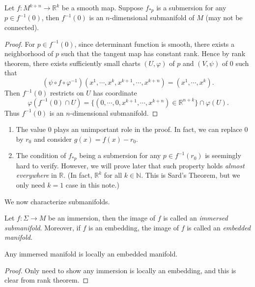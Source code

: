 \begin{thm}
    Let $f:M^{k+n}\to\mathbb{R}^k$ be a smooth map.
    Suppose $f_{*p}$ is a submersion for any $p\in f^{-1}(0)$, then $f^{-1}(0)$ is an $n$-dimensional submanifold of $M$ (may not be connected).
\end{thm}
\begin{proof}
    For $p\in f^{-1}(0)$, since determinant function is smooth, there exists a neighborhood of $p$ such that the tangent map has constant rank.
    Hence by rank theorem, there exists sufficiently small charts $(U,\varphi)$ of $p$ and $(V,\psi)$ of $0$ such that
    \[(\psi\circ f\circ\varphi^{-1})(x^1,\cdots,x^k,x^{k+1},\cdots,x^{k+n})=(x^1,\cdots,x^k).\]
    Then $f^{-1}(0)$ restricts on $U$ has coordinate
    \[\varphi(f^{-1}(0)\cap U)=\{(0,\cdots,0,x^{k+1},\cdots,x^{k+n})\in\mathbb{R}^{n+k}\}\cap\varphi(U).\]
    Thus $f^{-1}(0)$ is an $n$-dimensional submanifold.
\end{proof}
\begin{rem}
    \begin{enumerate}[(1)]
        \item The value $0$ plays an unimportant role in the proof.
        In fact, we can replace $0$ by $r_0$ and consider $g(x)=f(x)-r_0$.
        \item The condition of $f_{*p}$ being a submersion for any $p\in f^{-1}(r_0)$ is seemingly hard to verify.
        However, we will prove later that such property holds \emph{almost everywhere} in $\mathbb{R}$.
        (In fact, $\mathbb{R}^k$ for all $k\in\mathbb{N}$. This is Sard's Theorem, but we only need $k=1$ case in this note.)
    \end{enumerate}
\end{rem}

We now characterize submanifolds.
\begin{defn}
    Let $f:\Sigma\to M$ be an immersion, then the image of $f$ is called an \emph{immersed submanifold}.
    Moreover, if $f$ is an embedding, the image of $f$ is called an \emph{embedded manifold}.
\end{defn}

\begin{prop}
    Any immersed manifold is locally an embedded manifold.
\end{prop}
\begin{proof}
    Only need to show any immersion is locally an embedding, and this is clear from rank theorem.
\end{proof}

